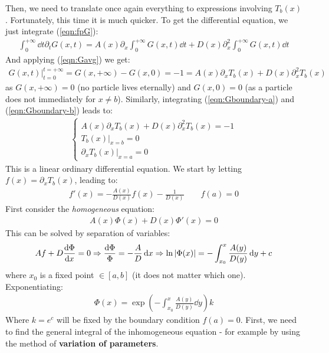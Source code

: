 \documentclass[../template.tex]{subfiles}
\begin{document}
Then, we need to translate once again everything to expressions involving $T_b(x)$. Fortunately, this time it is much quicker. To get the differential equation, we just integrate (\ref{eqn:fpG}):
\begin{align*}
    \int_{0}^{+\infty} \dd{t} \partial_t G(x,t) = A(x) \partial_x \int_0^{+\infty} G(x,t) \dd{t} + D(x) \partial_x^2 \int_0^{+\infty} G(x,t) \dd{t}
\end{align*}
And applying (\ref{eqn:Gavg}) we get:
\begin{align*}
    G(x,t)\Big|_{t=0}^{t=+\infty} = G(x,+\infty) - G(x,0) = -1 = A(x) \partial_x T_b(x) + D(x) \partial_x^2 T_b(x)
\end{align*}
as $G(x,+\infty) = 0$ (no particle lives eternally) and $G(x,0) = 0$ (as a particle does not  immediately for $x\neq b$). Similarly, integrating (\ref{eqn:Gboundary-a}) and (\ref{eqn:Gboundary-b}) leads to:
\begin{align*}
    \begin{cases}
        A(x) \partial_x T_b(x) + D(x) \partial_x^2 T_b(x) = -1\\
        T_b(x)|_{x=b} = 0\\
        \partial_x T_b(x) |_{x=a} = 0
    \end{cases}
\end{align*} 
This is a linear ordinary differential equation. We start by letting $f(x) = \partial_x T_b(x)$, leading to:
\begin{align*}
    f'(x) = - \frac{A(x)}{D(x)} f(x) - \frac{1}{D(x)} \qquad f(a) = 0 
\end{align*}
First consider the \textit{homogeneous} equation:
\begin{align*}
    A(x) \Phi(x) + D(x) \Phi'(x) = 0
\end{align*} 
This can be solved by separation of variables:
\begin{align*}
    Af + D\dv{\Phi}{x} = 0 \Rightarrow \frac{\dd{\Phi}}{\Phi} = - \frac{A}{D} \dd{x} \Rightarrow \ln |\Phi(x)| = -\int_{x_0}^x \frac{A(y)}{D(y)} \dd{y} + c
\end{align*}
where $x_0$ is a fixed point $\in [a,b]$ (it does not matter which one).
Exponentiating: 
\begin{align*}
    \Phi(x) = \exp\left(-\int_{x_0}^x \frac{A(y)}{D(y)}\dd{y} \right) k
\end{align*}
Where $k = e^c$ will be fixed by the boundary condition $f(a) = 0$. First, we need to find the general integral of the inhomogeneous equation - for example by using the method of \textbf{variation of parameters}.
\end{document}
